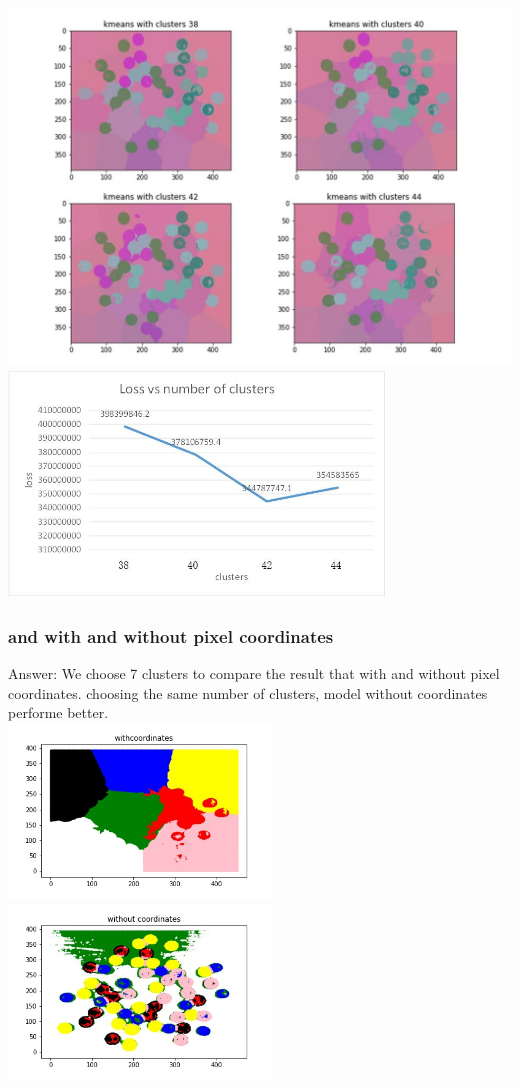 \documentclass[]{article}
\begin{document}
\includegraphics[width=13.5cm]{clusters.jpg}\\
\includegraphics[width=10cm]{loss1.jpg}


\subsubsection{and with and without pixel coordinates}
Answer: We choose 7 clusters to compare the result that with and without pixel coordinates. choosing the same number of clusters, model without coordinates performe better.\\

\includegraphics[width=7cm]{with_coordinates.jpg}
\includegraphics[width=7cm]{without_coordinates.jpg}
\end{document}
